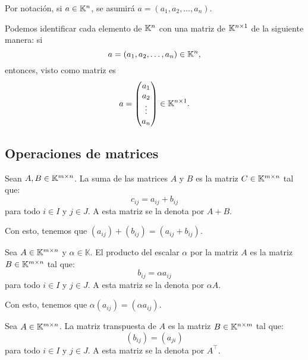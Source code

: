 \documentclass[a4,11pt]{aleph-notas}
\begin{document}
\begin{advertencia}
    Por notación, si $a\in\K^n$, se asumirá $a=(a_1,a_2,\ldots,a_n)$.
\end{advertencia}

\begin{advertencia}
    Podemos identificar cada elemento de $\K^n$ con una matriz de $\Mat[\K]{n}{1}$ de la siguiente manera: si
    \[
        a = (a_1,a_2,\ldots,a_n) \in \K^n,
    \]
    entonces, visto como matriz es
    \[
        a = 
        \begin{pmatrix}
            a_1\\a_2\\
            \vdots\\a_n
        \end{pmatrix}
        \in \Mat[\K]{n}{1}.
    \]
\end{advertencia}

\subsection{Operaciones de matrices}

\begin{defi}
    Sean $A, B \in \Mat[\K]{m}{n}$. La suma de las matrices $A$ y $B$ es la matriz $C\in \Mat[\K]{m}{n}$ tal que:
    \[ 
        c_{ij} = a_{ij} + b_{ij}
    \]
    para todo $i \in I$ y $j \in J$. A esta matriz se la denota por $A+B$.
\end{defi}

\begin{advertencia}
    Con esto, tenemos que $(a_{ij})+(b_{ij})=(a_{ij} + b_{ij})$.
\end{advertencia}

\begin{defi}
    Sea $A\in \Mat[\K]{m}{n}$ y $\alpha \in \mathbb{K}$. El producto del escalar $\alpha$ por la matriz $A$ es la matriz $B\in \Mat[\K]{m}{n}$ tal que:
    \[ 
        b_{ij} = \alpha a_{ij}
    \]
    para todo $i \in I$ y $j \in J$. A esta matriz se la denota por $\alpha A$.
\end{defi}

\begin{advertencia}
    Con esto, tenemos que $\alpha (a_{ij}) =(\alpha a_{ij})$.
\end{advertencia}

\begin{defi}
    Sea $A \in \Mat[\K]{m}{n}$. La matriz transpuesta de $A$ es la matriz $B\in \Mat[\K]{n}{m}$ tal que: 
    \[
        (b_{ij}) = (a_{ji})
    \]
    para todo $i\in I$ y $j \in J$. A esta matriz se la denota por $A^\intercal$.
\end{defi}
\end{document}
